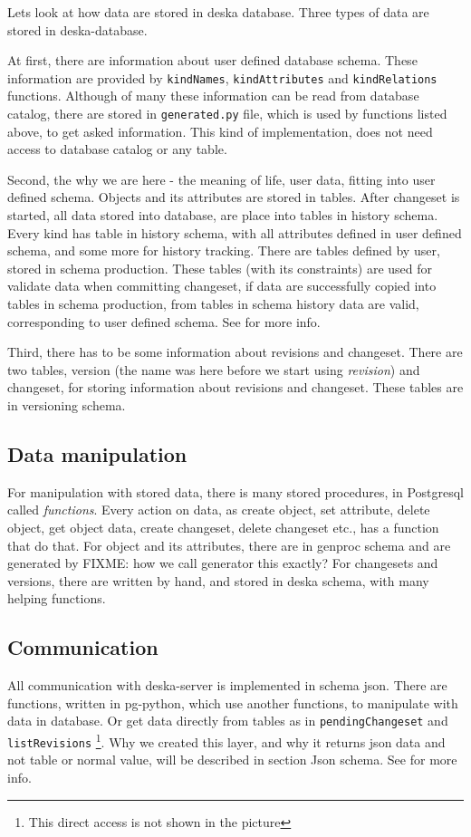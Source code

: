 \documentclass[deska]{subfiles}
\begin{document}
Lets look at how data are stored in deska database. Three types of data are stored in deska-database.

At first, there are information
about user defined database schema. These information are provided by {\tt kindNames}, {\tt kindAttributes} and {\tt kindRelations} functions.
Although of many these information can be read from database catalog, there are stored in {\tt generated.py} file, which is used by
functions listed above, to get asked information. This kind of implementation, does not need access to database catalog or any table.

Second, the why we are here - the meaning of life, user data, fitting into user defined schema.
Objects and its attributes are stored in tables. 
After changeset is started, all data stored into database, are place into tables in history schema. Every kind has table in history
schema, with all attributes defined in user defined schema, and some more for history tracking.
There are tables defined by user, stored in schema production. These tables
(with its constraints) are used for validate data when committing changeset, if data are successfully copied into tables in schema production,
from tables in schema history data are valid, corresponding to user defined schema.
See  for more info.

Third, there has to be some information about revisions and changeset. There are two tables, version (the name was here before
we start using {\em revision}) and changeset, for storing information about revisions and changeset. These tables are
in versioning schema.

\subsection{Data manipulation}
For manipulation with stored data, there is many stored procedures, in Postgresql called {\em functions}.
Every action on data, as create object, set attribute, delete object, get object data, create changeset, delete changeset etc.,
has a function that do that. For object and its attributes, there are in genproc schema and are generated by
FIXME: how we call generator this exactly?
For changesets and versions, there are written by hand, and stored in deska schema, with many helping functions.

\subsection{Communication}
All communication with deska-server is implemented in schema json. There are functions, written in pg-python, which use another
functions, to manipulate with data in database. Or get data directly from tables as in {\tt pendingChangeset} and {\tt listRevisions}
\footnote{This direct access is not shown in the picture}.
Why we created this layer, and why it returns json data and not table or normal value, will be described in section Json schema.
See  for more info.
\end{document}
